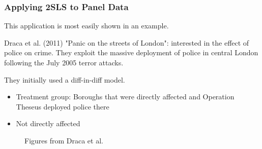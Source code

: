 \documentclass[11pt]{article}
\begin{document}
\subsubsection{Applying 2SLS to Panel Data}

This application is most easily shown in an example.

\begin{example}
    Draca et al. (2011) "Panic on the streets of London": interested in the effect of police on crime. They exploit the massive deployment of police in central London following the July 2005 terror attacks.

    They initially used a diff-in-diff model.
    \begin{itemize}
        \item Treatment group: Boroughs that were directly affected and Operation Theseus deployed police there
        \item Not directly affected
    \end{itemize}
\end{example}

\newpage
\begin{figure}[h]
    \centering
    \qquad
    \caption{Figures from Draca et al.}%
    \label{fig:2sls panel example}%
\end{figure}
\end{document}
